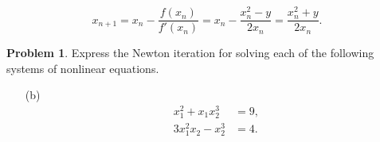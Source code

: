 \documentclass[a4paper]{book}
\makeatletter
\newenvironment{sol}[1][\solname]{\par
  \pushQED{\qed}
  \normalfont \topsep6\p@\@plus6\p@\relax
  \trivlist
  \item[\hskip\labelsep
        \itshape
    #1\@addpunct{.}]\ignorespaces
}{\popQED\endtrivlist\@endpefalse}
\providecommand{\solname}{Solution}
\numberwithin{equation}{chapter}
\theoremstyle{definition}
\newtheorem{pro}{Problem}
\makeatother
\begin{document}
  \begin{sol}
    \begin{displaymath}
      x_{n+1} = x_n - \frac{f(x_n)}{f'(x_n)} = x_n - \frac{x_n^2 - y}{2x_n}
      = \frac{x_n^2 + y}{2x_n}.
    \end{displaymath}
  \end{sol}


  \begin{pro}
    Express the Newton iteration for solving each of the following
    systems of nonlinear equations.
    \begin{itemize}
        \item [(b)]\begin{align*}
          x_1^2 + x_1x_2^3 &= 9, \\
          3x_1^2x_2 - x_2^3 &= 4.
        \end{align*}
    \end{itemize}
  \end{pro}
  
\end{document}
